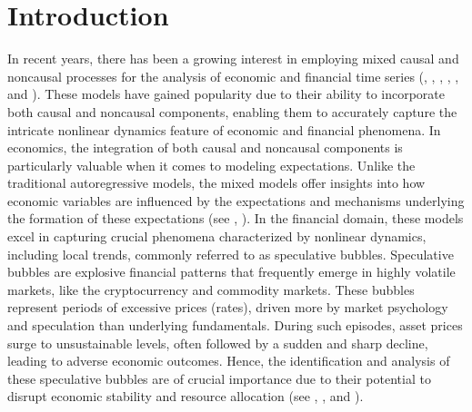 \documentclass[<1p>]{elsarticle} %
\begin{document}
\section{\textbf{Introduction}}
In recent years, there has been a growing interest in employing mixed causal and noncausal processes for the analysis of economic and financial time series (\cite{lanne2013noncausal}, \cite{hecq2016identification}, \cite{gourieroux2022nonlinear}, \cite{gourieroux2022nonlinear}, \cite{rygh2022causal}, and \cite{cavaliere2020bootstrapping}). These models have gained popularity due to their ability to incorporate both causal and noncausal components, enabling them to accurately capture the intricate nonlinear dynamics feature of economic and financial phenomena. In economics, the integration of both causal and noncausal components is particularly valuable when it comes to modeling expectations. Unlike the traditional autoregressive models, the mixed models offer insights into how economic variables are influenced by the expectations and mechanisms underlying the formation of these expectations (see \cite{lanne2011noncausal}, \cite{lanne2013noncausal}). In the financial domain, these models excel in capturing crucial phenomena characterized by nonlinear dynamics, including local trends, commonly referred to as speculative bubbles. Speculative bubbles are explosive financial patterns that frequently emerge in highly volatile markets, like the cryptocurrency and commodity markets. These bubbles represent periods of excessive prices (rates), driven more by market psychology and speculation than underlying fundamentals. During such episodes, asset prices surge to unsustainable levels, often followed by a sudden and sharp decline, leading to adverse economic outcomes. Hence, the identification and analysis of these speculative bubbles are of crucial importance due to their potential to disrupt economic stability and resource allocation (see \cite{gourieroux2017noncausal}, \cite{fries2019mixed}, and \cite{hecq2021forecasting}).\\
\end{document}
